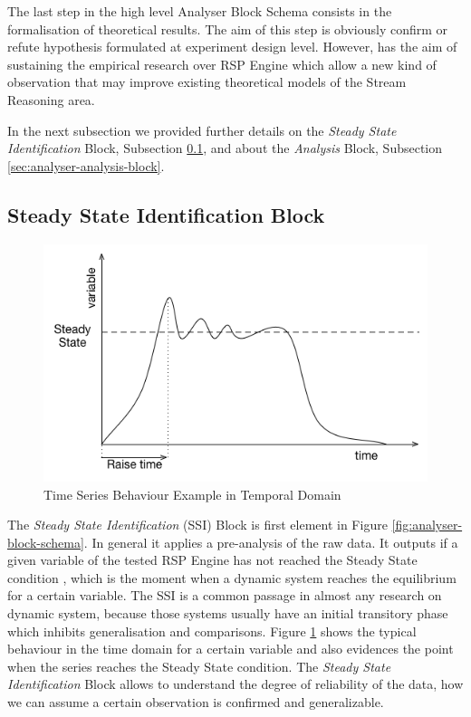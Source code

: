 The last step in the high level Analyser Block Schema consists in the formalisation of theoretical results. The aim of this step is obviously confirm or refute hypothesis formulated at experiment design level. However, \name has the aim of sustaining the empirical research over RSP Engine which allow a new kind of observation that may improve existing theoretical models of the Stream Reasoning area.

In the next subsection we provided further details on the \textit{Steady State Identification} Block, Subsection \ref{sec:analyser-ss-block}, and about the \textit{Analysis} Block, Subsection \ref{sec:analyser-analysis-block}. 

\subsection{Steady State Identification Block}\label{sec:analyser-ss-block}

\begin{figure}[tbh]
  \centering
	\includegraphics[width=0.5\linewidth]{images/steady-state}
	\caption{Time Series Behaviour Example in Temporal Domain} 	
  	\label{fig:steady-state}
\end{figure}

The \textit{Steady State Identification} (SSI) Block is first element in Figure \ref{fig:analyser-block-schema}. In general it applies a pre-analysis of the raw data. It outputs if a given variable of the tested RSP Engine has not reached the Steady State condition , which is the moment when a dynamic system reaches the equilibrium for a certain variable. The SSI is a common passage in almost any research on dynamic system, because those systems usually have an initial transitory phase which inhibits generalisation and comparisons. Figure \ref{fig:steady-state} shows the typical behaviour in the time domain for a certain variable and also evidences the point when the series reaches the Steady State condition. The \textit{Steady State Identification} Block allows to understand the degree of reliability of the data, how we can assume a certain observation is confirmed and generalizable. %


